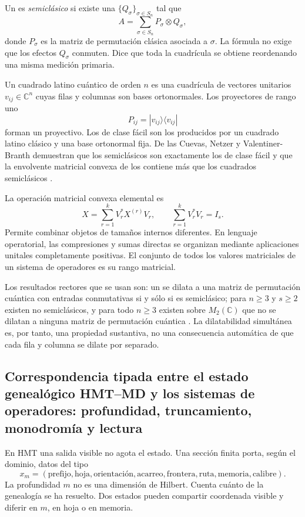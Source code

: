 Un \QMS es \emph{semiclásico} si existe una \POVM
\(\{Q_\sigma\}_{\sigma\in S_n}\) tal que
\[
 A=\sum_{\sigma\in S_n}P_\sigma\otimes Q_\sigma,
 \tag{GMC-1.2}
\]
donde $P_\sigma$ es la matriz de permutación clásica asociada a
$\sigma$. La fórmula no exige que los efectos $Q_\sigma$ conmuten. Dice
que toda la cuadrícula se obtiene reordenando una misma medición primaria.

Un cuadrado latino cuántico de orden $n$ es una cuadrícula de vectores
unitarios $v_{ij}\in\mathbb C^n$ cuyas filas y columnas son bases
ortonormales. Los proyectores de rango uno
\[
 P_{ij}=|v_{ij}\rangle\langle v_{ij}|
\]
forman un \QMS proyectivo. Los \QLS de clase fácil son los producidos por un cuadrado
latino clásico y una base ortonormal fija. De las Cuevas, Netzer y
Valentiner-Branth demuestran que los \QLS semiclásicos son exactamente los de
clase fácil y que la envolvente matricial convexa de los \QLS contiene más que los
cuadrados semiclásicos \citep{delascuevas2023latin}.

La operación matricial convexa elemental es
\[
 X=\sum_{r=1}^{k}V_r^*X^{(r)}V_r,
 \qquad
 \sum_{r=1}^{k}V_r^*V_r=I_s.
 \tag{GMC-1.3}
\]
Permite combinar objetos de tamaños internos diferentes. En lenguaje
operatorial, las compresiones y sumas directas se organizan mediante
aplicaciones unitales completamente positivas. El conjunto de todos los
valores matriciales de un sistema de operadores es su rango matricial.

\begin{importbox}
Los resultados rectores que se usan son: un \QMS se dilata a una matriz de
permutación cuántica con entradas conmutativas si y sólo si es semiclásico;
para $n\ge3$ y $s\ge2$ existen \QMS no semiclásicos, y para todo $n\ge3$ existen
\QMS sobre $M_2(\mathbb C)$ que no se dilatan a ninguna matriz de
permutación cuántica \citep{delascuevas2020qms}. La dilatabilidad simultánea
es, por tanto, una propiedad sustantiva, no una consecuencia automática de
que cada fila y columna se dilate por separado.
\end{importbox}

\subsection{Correspondencia tipada entre el estado genealógico HMT–MD y los sistemas de operadores: profundidad, truncamiento, monodromía y lectura}

En HMT una salida visible no agota el estado. Una sección finita
porta, según el dominio, datos del tipo
\[
 x_m=(\text{prefijo},\text{hoja},\text{orientación},\text{acarreo},
       \text{frontera},\text{ruta},\text{memoria},\text{calibre}).
 \tag{GMC-1.4}
\]
La profundidad $m$ no es una dimensión de Hilbert. Cuenta cuánto de la
genealogía se ha resuelto. Dos estados pueden compartir coordenada visible y
diferir en $m$, en hoja o en memoria.

